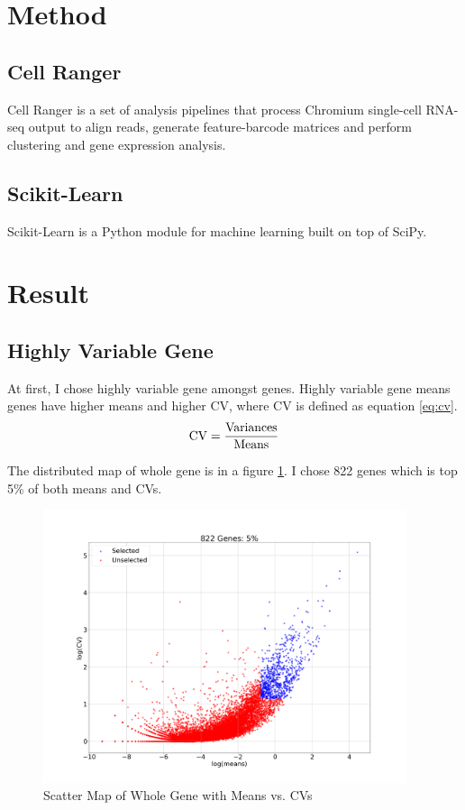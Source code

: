 \documentclass[aps, 10pt, a4paper]{article}
\begin{document}
    \section{Method}
        \subsection{Cell Ranger}
            Cell Ranger is a set of analysis pipelines that process Chromium single-cell RNA-seq output to align reads, generate feature-barcode matrices and perform clustering and gene expression analysis. \cite{ref:cellranger}
        
        \subsection{Scikit-Learn}
            Scikit-Learn is a Python module for machine learning built on top of SciPy. \cite{ref:scikit}
    
    \section{Result}
        \subsection{Highly Variable Gene}
            At first, I chose highly variable gene amongst genes. Highly variable gene means genes have higher means and higher CV, where CV is defined as equation \ref{eq:cv}.
            \begin{equation}
                \rm{CV} = \frac{\rm{Variances}}{\rm{Means}}
                \label{eq:cv}
            \end{equation}
            
            The distributed map of whole gene is in a figure \ref{fig:hvg}. I chose 822 genes which is top 5\% of both means and CVs. 
            \begin{figure}[tbph]
                \centering
                \includegraphics[height=8cm]{figures/HVG.png}
                \caption{Scatter Map of Whole Gene with Means vs. CVs}
                \label{fig:hvg}
            \end{figure}
        
\end{document}
